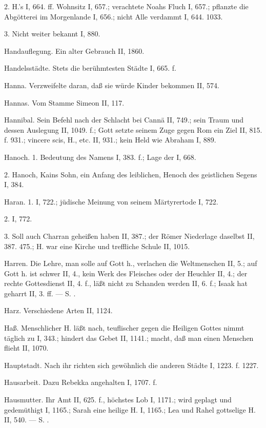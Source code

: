 2. H.’s  I, 664. ff. Wohnsitz I, 657.; verachtete Noahs Fluch I, 657.; pflanzte die Abgötterei im Morgenlande I, 656.; nicht Alle verdammt I, 644. 1033.

3.  Nicht weiter bekannt I, 880.

Handauflegung. Ein alter Gebrauch II, 1860.

Handelsstädte. Stets die berühmtesten Städte I, 665. f.

Hanna. Verzweifelte daran, daß sie würde Kinder bekommen II, 574.

Hannas. Vom Stamme Simeon II, 117.

Hannibal. Sein Befehl nach der Schlacht bei Cannä II, 749.; sein Traum und dessen Auslegung II, 1049. f.; Gott setzte seinem Zuge gegen Rom ein Ziel II, 815. f. 931.; vincere scis, H., etc. II, 931.; kein Held wie Abraham I, 889.

Hanoch. 1. Bedeutung des Namens I, 383. f.; Lage der  I, 668.

2.  Hanoch, Kains Sohn, ein Anfang des leiblichen, Henoch des geistlichen Segens I, 384.

Haran. 1.  I, 722.; jüdische Meinung von seinem Märtyrertode I, 722.

2.  I, 772.

3.  Soll auch Charran geheißen haben II, 387.; der Römer Niederlage daselbst II, 387. 475.; H. war eine Kirche und treffliche Schule II, 1015.

Harren. Die Lehre, man solle auf Gott h., verlachen die Weltmenschen II, 5.; auf Gott h. ist schwer II, 4., kein Werk des Fleisches oder der Heuchler II, 4.; der rechte Gottesdienst II, 4. f., läßt nicht zu Schanden werden II, 6. f.; Isaak hat geharrt II, 3. ff. — S. .

Harz. Verschiedene Arten II, 1124.

Haß. Menschlicher H. läßt nach, teuflischer gegen die Heiligen Gottes nimmt täglich zu I, 343.; hindert das Gebet II, 1141.; macht, daß man einen Menschen flieht II, 1070.

Hauptstadt. Nach ihr richten sich gewöhnlich die anderen Städte I, 1223. f. 1227.

Hausarbeit. Dazu Rebekka angehalten I, 1707. f.

Hausmutter. Ihr Amt II, 625. f., höchstes Lob I, 1171.; wird geplagt und gedemüthigt I, 1165.; Sarah eine heilige H. I, 1165.; Lea und Rahel gottselige H. II, 540. — S. .

